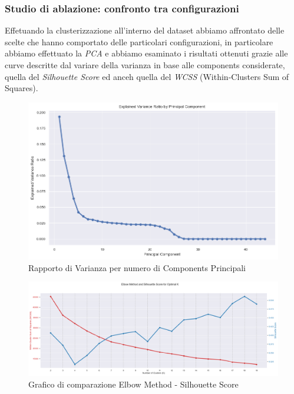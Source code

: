 \documentclass[12pt,a4paper,twoside]{article}
\begin{document}
\subsubsection{Studio di ablazione: confronto tra configurazioni}
Effetuando la clusterizzazione all'interno del dataset abbiamo affrontato delle scelte che hanno 
comportato delle particolari configurazioni, in particolare abbiamo effettuato la \textit{PCA} e 
abbiamo esaminato i risultati ottenuti grazie alle curve descritte dal variare della varianza in 
base alle components considerate, quella del \textit{Silhouette Score} ed anceh quella del 
\textit{WCSS} (Within-Clusters Sum of Squares).\\
\begin{figure}[!ht]
    \centering
    \includegraphics[width=\textwidth, height=\textheight, keepaspectratio]{assets/variance-ratio.png}
    \caption{Rapporto di Varianza per numero di Components Principali}
    \label{fig:variance-ratio}
\end{figure}
\begin{figure}[!ht]
    \centering
    \includegraphics[width=\textwidth, height=\textheight, keepaspectratio]{assets/elbow-silhouette.png}
    \caption{Grafico di comparazione Elbow Method - Silhouette Score}
    \label{fig:elbow-silhouette}
\end{figure}
\end{document}
